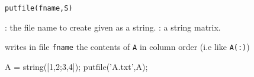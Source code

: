 
\begin{mandesc}
\end{mandesc}
\begin{calling_sequence}
\begin{verbatim}
putfile(fname,S)
\end{verbatim}
\end{calling_sequence}
\begin{parameters}
  \begin{varlist}
     : the file name to create given as a string.
     : a string matrix.
  \end{varlist}
\end{parameters}

\begin{mandescription}
writes in file \verb+fname+ the contents of \verb+A+ in column order (i.e like \verb+A(:)+)
\end{mandescription}

\begin{examples}
  \begin{program}
    A = string([1,2;3,4]);
    putfile('A.txt',A);
  \end{program}
\end{examples}


